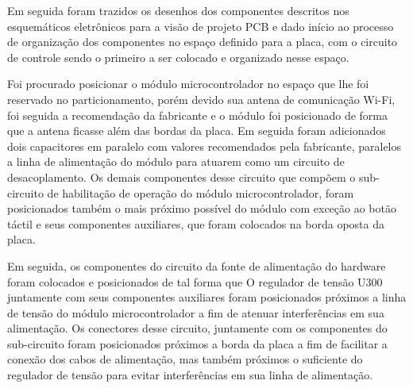    \begin{figure}[h!]
            \captionsetup{width=9cm}
   \end{figure}


Em seguida foram trazidos os desenhos dos componentes descritos nos esquemáticos eletrônicos para a visão de projeto PCB e dado início ao processo de organização dos componentes no espaço definido para a placa, com o circuito de controle sendo o primeiro a ser colocado e organizado nesse espaço.

Foi procurado posicionar o módulo microcontrolador no espaço que lhe foi reservado no particionamento, porém devido sua antena de comunicação Wi-Fi, foi seguida a recomendação da fabricante e o módulo foi posicionado de forma que a antena ficasse além das bordas da placa. Em seguida foram adicionados dois capacitores em paralelo com valores recomendados pela fabricante, paralelos a linha de alimentação do módulo para atuarem como um circuito de desacoplamento. Os demais componentes desse circuito que compõem o sub-circuito de habilitação de operação do módulo microcontrolador, foram posicionados também o mais próximo possível do módulo com exceção ao botão táctil e seus componentes auxiliares, que foram colocados na borda oposta da placa.

Em seguida, os componentes do circuito da fonte de alimentação do hardware foram colocados e posicionados de tal forma que O regulador de tensão U300 juntamente com seus componentes auxiliares foram posicionados próximos a linha de tensão do módulo microcontrolador a fim de atenuar interferências em sua alimentação. Os conectores desse circuito, juntamente com os componentes do sub-circuito foram posicionados próximos a borda da placa a fim de facilitar a conexão dos cabos de alimentação, mas também próximos o suficiente do regulador de tensão para evitar interferências em sua linha de alimentação. 

